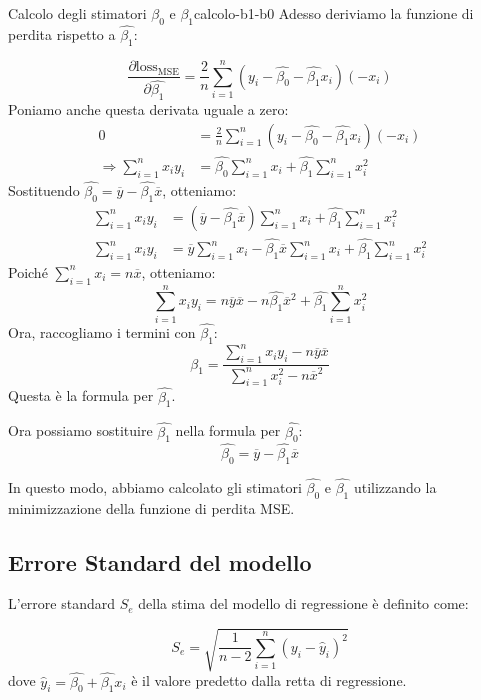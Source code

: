 \begin{dimostrazione}{Calcolo degli stimatori \( \beta_0 \) e \( \beta_1 \)}{calcolo-b1-b0}
Adesso deriviamo la funzione di perdita rispetto a \( \hat{\beta_1} \):

\[
    \frac{\partial \text{loss}_{\text{MSE}}}{\partial \hat{\beta_1}} = \frac{2}{n} \sum_{i=1}^n \left( y_i - \hat{\beta_0} - \hat{\beta_1} x_i \right) (-x_i)
\]
Poniamo anche questa derivata uguale a zero:
\begin{align*}
    0 &= \frac{2}{n} \sum_{i=1}^n \left( y_i - \hat{\beta_0} - \hat{\beta_1} x_i \right) (-x_i)\\
    \Rightarrow \sum_{i=1}^n x_i y_i &= \hat{\beta_0} \sum_{i=1}^n x_i + \hat{\beta_1} \sum_{i=1}^n x_i^2
\end{align*}
Sostituendo \( \hat{\beta_0} = \overline{y} - \hat{\beta_1} \overline{x} \), otteniamo:
\begin{align*}
    \sum_{i=1}^n x_i y_i &= \left( \overline{y} - \hat{\beta_1} \overline{x} \right) \sum_{i=1}^n x_i + \hat{\beta_1} \sum_{i=1}^n x_i^2 \\
    \sum_{i=1}^n x_i y_i &= \overline{y} \sum_{i=1}^n x_i - \hat{\beta_1} \overline{x} \sum_{i=1}^n x_i + \hat{\beta_1} \sum_{i=1}^n x_i^2
\end{align*}
Poiché \( \sum_{i=1}^n x_i = n \overline{x} \), otteniamo:
\[
\sum_{i=1}^n x_i y_i = n \overline{y} \overline{x} - n \hat{\beta_1} \overline{x}^2 + \hat{\beta_1} \sum_{i=1}^n x_i^2
\]
Ora, raccogliamo i termini con \( \hat{\beta_1} \):
\[
\hat{\beta_1} = \frac{\sum_{i=1}^n x_i y_i - n \overline{y} \overline{x}}{\sum_{i=1}^n x_i^2 - n \overline{x}^2}
\]
Questa è la formula per \( \hat{\beta_1} \).

Ora possiamo sostituire \( \hat{\beta_1} \) nella formula per \( \hat{\beta_0} \):
\[
\hat{\beta_0} = \overline{y} - \hat{\beta_1} \overline{x}
\]

In questo modo, abbiamo calcolato gli stimatori \( \hat{\beta_0} \) e \( \hat{\beta_1} \) utilizzando la minimizzazione della funzione di perdita MSE.

\end{dimostrazione}


\subsection{Errore Standard del modello}

L'errore standard \( S_e \) della stima del modello di regressione è definito come:

\[
S_e = \sqrt{\frac{1}{n-2} \sum_{i=1}^n (y_i - \hat{y}_i)^2}
\]
dove \( \hat{y}_i = \hat{\beta_0} + \hat{\beta_1} x_i \) è il valore predetto dalla retta di regressione.



